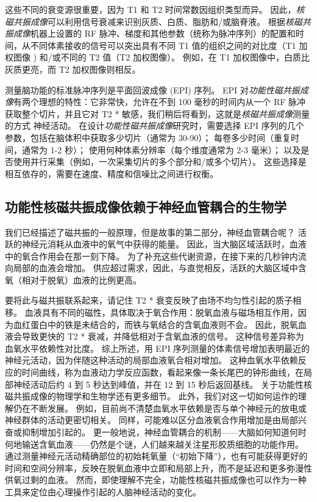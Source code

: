 这些不同的衰变源很重要，因为 T1 和 T2 时间常数因组织类型而异。 
因此，\textit{核磁共振成像}可以利用信号衰减来识别灰质、白质、脂肪和/或脑脊液。 
根据\textit{核磁共振成像}机器上设置的 RF 脉冲、梯度和其他参数（统称为脉冲序列）的配置和时间，从不同体素接收的信号可以突出具有不同 T1 值的组织之间的对比度（T1 加权图像 ) 和/或不同的 T2 值（T2 加权图像）。 
例如，在 T1 加权图像中，白质比灰质更亮，而 T2 加权图像则相反。


测量脑功能的标准脉冲序列是平面回波成像 (EPI) 序列。 
EPI 对\textit{功能性磁共振成像}有两个理想的特性：它非常快，允许在不到 100 毫秒的时间内从一个 RF 脉冲获取整个切片，并且它对 T2 * 敏感，我们稍后将看到，这就是\textit{核磁共振成像}测量的方式 神经活动。 
在设计\textit{功能性磁共振成像}研究时，需要选择 EPI 序列的几个参数，包括在脑体积中获取多少切片（通常为 30-90）； 
每卷多少时间（重复时间，通常为 1-2 秒）； 使用何种体素分辨率（每个维度通常为 2-3 毫米）； 
以及是否使用并行采集（例如，一次采集切片的多个部分和/或多个切片）。 
这些选择是相互依存的，需要在速度、精度和信噪比之间进行权衡。



\subsection{功能性核磁共振成像依赖于神经血管耦合的生物学}

我们已经描述了磁共振的一般原理，但是故事的第二部分，神经血管耦合呢？
活跃的神经元消耗从血液中的氧气中获得的能量。 
因此，当大脑区域活跃时，血液中的氧合作用会在那一刻下降。
为了补充这些代谢资源，在接下来的几秒钟内流向局部的血液会增加。
供应超过需求，因此，与直觉相反，活跃的大脑区域中含氧（相对于脱氧）血液的比例更高。


要将此与磁共振联系起来，请记住 T2 * 衰变反映了由场不均匀性引起的质子相移。 
血液具有不同的磁性，具体取决于氧合作用：脱氧血液与磁场相互作用，因为血红蛋白中的铁是未结合的，而铁与氧结合的含氧血液则不会。
因此，脱氧血液会导致更快的 T2 * 衰减，并降低相对于含氧血液的信号。
这种信号差异称为血氧水平依赖性对比度。 
综上所述，用 EPI 序列测量的体素信号增加表明最近的神经元活动，因为伴随这种活动的局部血液氧合相对增加。
这种血氧水平依赖反应的时间曲线，称为血液动力学反应函数，看起来像一条长尾巴的钟形曲线，在局部神经活动后约 4 到 5 秒达到峰值，并在 12 到 15 秒后返回基线。
关于功能性核磁共振成像的物理学和生物学还有更多细节。 
此外，我们对这一切如何运作的理解仍在不断发展。 
例如，目前尚不清楚血氧水平依赖是否与单个神经元的放电或神经群体的活动更密切相关。 
同样，可能难以区分血液氧合作用增加是由局部兴奋或抑制增加引起的。 
更一般地说，神经血管耦合的机制——大脑如何知道何时何地输送含氧血液——仍然是个谜，人们越来越关注星形胶质细胞的功能作用。 
通过测量神经元活动精确部位的初始耗氧量（“初始下降”），也有可能获得更好的时间和空间分辨率，反映在脱氧血液中立即和局部上升，而不是延迟和更多弥漫性供氧过剩的血液。 
然而，即使理解不完全，功能性核磁共振成像也可以作为一种工具来定位由心理操作引起的人脑神经活动的变化。



